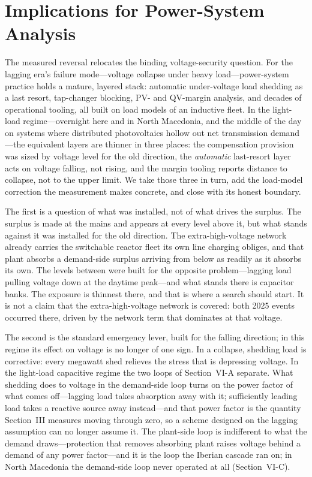 \documentclass[journal]{IEEEtran}
\begin{document}
\section{Implications for Power-System Analysis}
The measured reversal relocates the binding voltage-security question. For the
lagging era's failure mode---voltage collapse under heavy load---power-system
practice holds a mature, layered stack: automatic under-voltage load shedding as
a last resort, tap-changer blocking, PV- and QV-margin analysis, and decades of
operational tooling, all built on load models of an inductive fleet. In the light-load regime---overnight here and in North Macedonia, and the middle of the day on systems where distributed photovoltaics hollow out net transmission demand---the equivalent layers are thinner in three places: the compensation
provision was sized by voltage level for the old direction, the \emph{automatic}
last-resort layer acts on voltage falling, not rising, and the margin tooling
reports distance to collapse, not to the upper limit. We take those three in
turn, add the load-model correction the measurement makes concrete, and close
with its honest boundary.

The first is a question of what was installed, not of what drives the surplus. The surplus is made at the mains and appears at every level above it, but what stands against it was installed for the old direction. The extra-high-voltage network already carries the switchable reactor fleet its own line charging obliges, and that plant absorbs a demand-side surplus arriving from below as readily as it absorbs its own. The levels between were built for the opposite problem---lagging load pulling voltage down at the daytime peak---and what stands there is capacitor banks. The exposure is thinnest there, and that is where a search should start. It is not a claim that the extra-high-voltage network is covered: both 2025 events occurred there, driven by the network term that dominates at that voltage.

The second is the standard emergency lever, built for the falling direction; in
this regime its effect on voltage is no longer of one sign. In a collapse, shedding
load is corrective: every megawatt shed relieves the stress that is depressing
voltage. In the light-load capacitive regime the two loops of Section~VI-A
separate. What shedding does to voltage in the demand-side loop turns on the
power factor of what comes off---lagging load takes absorption away with it;
sufficiently leading load takes a reactive source away instead---and that
power factor is the quantity Section~III measures moving through zero, so a
scheme designed on the lagging assumption can no longer assume it. The
plant-side loop is indifferent to what the demand draws---protection that
removes absorbing plant raises voltage behind a demand of any power
factor---and it is the loop the Iberian cascade ran on; in North Macedonia
the demand-side loop never operated at all (Section~VI-C).
\end{document}
